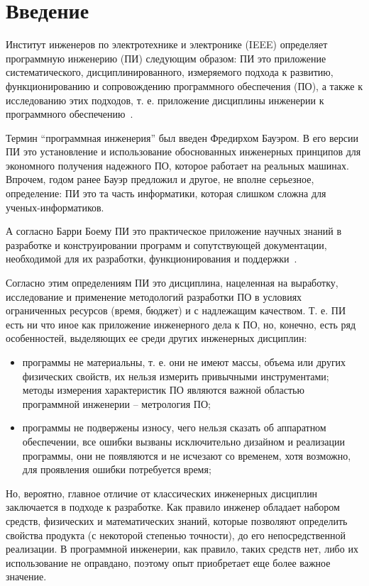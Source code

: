 \section{Введение}

Институт инженеров по электротехнике и электронике (IEEE) определяет программную инженерию (ПИ) следующим образом: ПИ это приложение систематического, дисциплинированного, измеряемого подхода к развитию, функционированию и сопровождению программного обеспечения (ПО), а также к исследованию этих подходов, т. е. приложение дисциплины инженерии к программного обеспечению~\cite{IEEEVOC}.

Термин “программная инженерия” был введен Фредирхом Бауэром. В его версии ПИ это установление и использование обоснованных инженерных принципов для экономного получения надежного ПО, которое работает на реальных машинах. Впрочем, годом ранее Бауэр предложил и другое, не вполне серьезное, определение: ПИ это та часть информатики, которая слишком сложна для ученых-информатиков.

А согласно Барри Боему ПИ это практическое приложение научных знаний в разработке и конструировании программ и сопутствующей документации, необходимой для их разработки, функционирования и поддержки~\cite{Boehm:1976:SE}.

Согласно этим определениям ПИ это дисциплина, нацеленная на выработку, исследование и применение методологий разработки ПО в условиях ограниченных ресурсов (время, бюджет) и с надлежащим качеством. Т. е. ПИ есть ни что иное как приложение инженерного дела к ПО, но, конечно, есть ряд особенностей, выделяющих ее среди других инженерных дисциплин:
\begin{itemize}
  \item программы не материальны, т. е. они не имеют массы, объема или других физических свойств, их нельзя измерить привычными инструментами; методы измерения характеристик ПО являются важной областью программной инженерии – метрология ПО;
  \item программы не подвержены износу, чего нельзя сказать об аппаратном обеспечении, все ошибки вызваны исключительно дизайном и реализации программы, они не появляются и не исчезают со временем, хотя возможно, для проявления ошибки потребуется время;
\end{itemize}

Но, вероятно, главное отличие от классических инженерных дисциплин заключается в  подходе к разработке. Как правило инженер обладает набором средств, физических и математических знаний, которые позволяют определить свойства продукта (с некоторой степенью точности), до его непосредственной реализации. В программной инженерии, как правило, таких средств нет, либо их использование не оправдано, поэтому опыт приобретает еще более важное значение.

